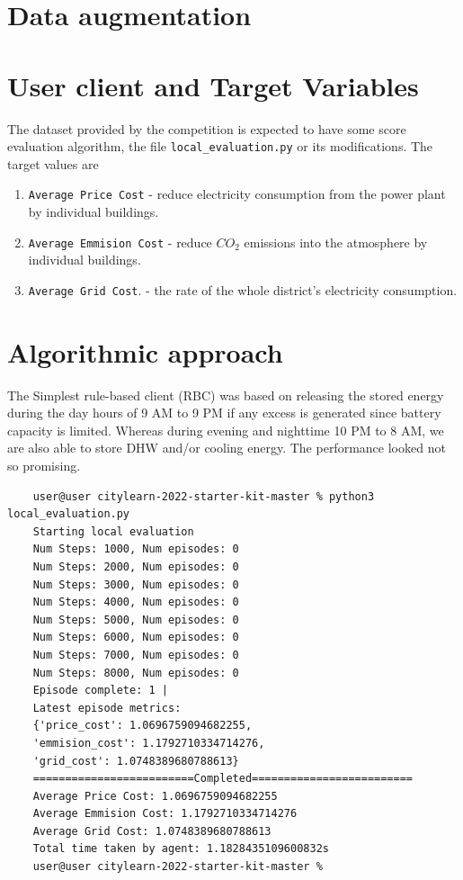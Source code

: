 \documentclass{article}
\numberwithin{equation}{subsection}
\begin{document}
\section{Data augmentation}

\section{User client and Target Variables}

The dataset provided by the competition is expected to have some score evaluation algorithm, the file \verb!local_evaluation.py! or its modifications. The target values are 
\begin{enumerate}
	\item \verb!Average Price Cost! - reduce electricity consumption from the power plant by individual buildings.
	\item \verb!Average Emmision Cost! - reduce $CO_2$ emissions into the atmosphere by individual buildings.
	\item \verb!Average Grid Cost!. - the rate of the whole district's electricity consumption.
\end{enumerate}








\section{Algorithmic approach}

The Simplest rule-based client (RBC) was based on releasing the stored energy during the day hours of 9 AM to 9 PM if any excess is generated since battery capacity is limited. Whereas during evening and nighttime 10 PM to 8 AM, we are also able to store DHW and/or cooling energy. The performance looked not so promising. 

\begin{verbatim}
	user@user citylearn-2022-starter-kit-master % python3 local_evaluation.py 
	Starting local evaluation
	Num Steps: 1000, Num episodes: 0
	Num Steps: 2000, Num episodes: 0
	Num Steps: 3000, Num episodes: 0
	Num Steps: 4000, Num episodes: 0
	Num Steps: 5000, Num episodes: 0
	Num Steps: 6000, Num episodes: 0
	Num Steps: 7000, Num episodes: 0
	Num Steps: 8000, Num episodes: 0
	Episode complete: 1 | 
	Latest episode metrics: 
	{'price_cost': 1.0696759094682255, 
	'emmision_cost': 1.1792710334714276, 
	'grid_cost': 1.0748389680788613}
	=========================Completed=========================
	Average Price Cost: 1.0696759094682255
	Average Emmision Cost: 1.1792710334714276
	Average Grid Cost: 1.0748389680788613
	Total time taken by agent: 1.1828435109600832s
	user@user citylearn-2022-starter-kit-master % 
\end{verbatim}
\end{document}
